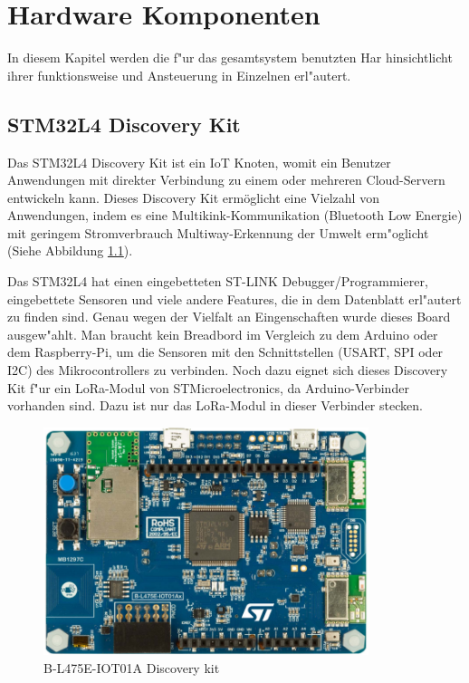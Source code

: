 \chapter{Hardware Komponenten}\label{Komponente}

In diesem Kapitel werden die f"ur das gesamtsystem benutzten Har hinsichtlicht ihrer funktionsweise und Ansteuerung in Einzelnen erl"autert. 

\section{STM32L4 Discovery Kit}\label{LoRa}

Das STM32L4 Discovery Kit ist ein IoT Knoten, womit ein Benutzer Anwendungen mit direkter Verbindung zu einem oder mehreren Cloud-Servern entwickeln kann.
Dieses Discovery Kit erm\"oglicht eine Vielzahl von Anwendungen, indem es eine Multikink-Kommunikation (Bluetooth Low Energie) mit geringem Stromverbrauch  Multiway-Erkennung der Umwelt erm"oglicht (Siehe Abbildung \ref{Node}).

Das STM32L4 hat einen eingebetteten ST-LINK Debugger/Programmierer, eingebettete Sensoren und viele andere Features, die in dem Datenblatt \cite{B-L475E-IOT01A} erl"autert zu finden sind. Genau wegen der Vielfalt an Eingenschaften wurde dieses Board ausgew"ahlt. Man braucht kein Breadbord im Vergleich zu dem Arduino oder dem Raspberry-Pi, um die Sensoren mit den Schnittstellen (USART, SPI oder I2C) des Mikrocontrollers zu verbinden. Noch dazu eignet sich dieses Discovery Kit f"ur ein LoRa-Modul von STMicroelectronics, da Arduino-Verbinder vorhanden sind. Dazu ist nur das LoRa-Modul in dieser Verbinder stecken. 

\begin{figure}[h]
	\centering
	\includegraphics[width=9.5cm]{source/images/Board}
	\caption{B-L475E-IOT01A Discovery kit \cite{B-L475E-IOT01A}}\label{Node}
\end{figure}

